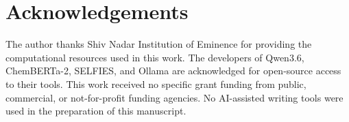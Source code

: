 \documentclass[twoside,twocolumn,9pt]{article}
\begin{document}
\section*{Acknowledgements}

The author thanks Shiv Nadar Institution of Eminence for providing the computational resources used in this work. The developers of Qwen3.6, ChemBERTa-2, SELFIES, and Ollama are acknowledged for open-source access to their tools. This work received no specific grant funding from public, commercial, or not-for-profit funding agencies. No AI-assisted writing tools were used in the preparation of this manuscript.


\balance



\end{document}
